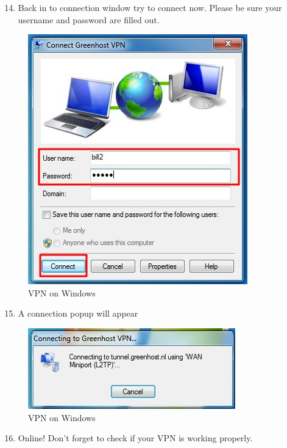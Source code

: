 \begin{enumerate}[1.]
\setcounter{enumi}{13}
\item
  Back in to connection window try to connect now. Please be sure your
  username and password are filled out.
\end{enumerate}
\begin{figure}[htbp]
\centering
\includegraphics{vpn_windows_13.jpg}
\caption{VPN on Windows}
\end{figure}

\begin{enumerate}[1.]
\setcounter{enumi}{14}
\item
  A connection popup will appear
\end{enumerate}
\begin{figure}[htbp]
\centering
\includegraphics{vpn_windows_14.jpg}
\caption{VPN on Windows}
\end{figure}

\begin{enumerate}[1.]
\setcounter{enumi}{15}
\item
  Online! Don't forget to check if your VPN is working properly.
\end{enumerate}

